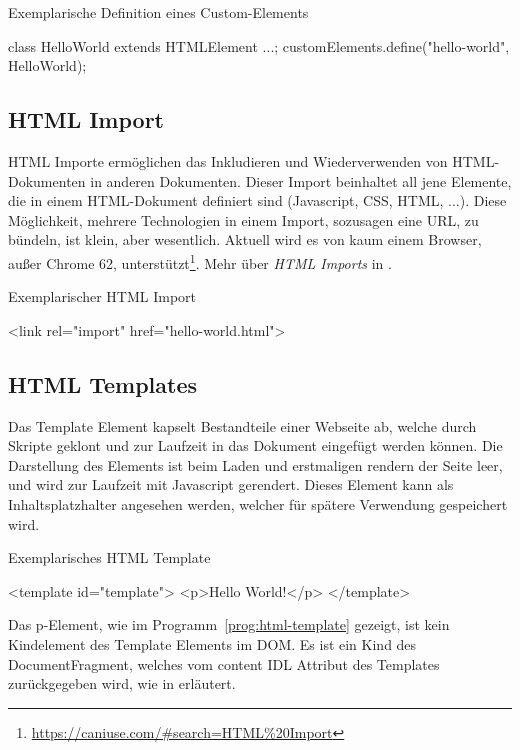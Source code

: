 \begin{program}[!htbp]
\caption{Exemplarische Definition eines Custom-Elements}
\begin{JsCode}
class HelloWorld extends HTMLElement {...};
customElements.define("hello-world", HelloWorld);
\end{JsCode}
\end{program}
\subsection{HTML Import}
HTML Importe ermöglichen das Inkludieren und Wiederverwenden von HTML-Dokumenten in anderen Dokumenten. Dieser Import beinhaltet all jene Elemente, die in einem HTML-Dokument definiert sind (Javascript, CSS, HTML, ...). 
Diese Möglichkeit, mehrere Technologien in einem Import, sozusagen eine URL, zu bündeln, ist klein, aber wesentlich. Aktuell wird es von kaum einem Browser, außer Chrome 62,  unterstützt\footnote{\url{https://caniuse.com/\#search=HTML\%20Import}}. Mehr über \emph{HTML Imports} in \cite{html-imports}.

\begin{program}[!htbp]
\caption{Exemplarischer HTML Import}
\begin{JsCode}
<link rel="import" href="hello-world.html">
\end{JsCode}
\end{program}
\subsection{HTML Templates}
Das Template Element kapselt Bestandteile einer Webseite ab, welche durch Skripte geklont und zur Laufzeit in das Dokument eingefügt werden können. Die Darstellung des Elements ist beim Laden und erstmaligen rendern der Seite leer, und wird zur Laufzeit mit Javascript gerendert. Dieses Element kann als Inhaltsplatzhalter angesehen werden, welcher für spätere Verwendung gespeichert wird. 

\begin{program}[!htbp]
\caption{Exemplarisches HTML Template}
\label{prog:html-template}
\begin{JsCode}
<template id="template">
	<p>Hello World!</p>
</template>
\end{JsCode}
\end{program}
Das p-Element, wie im Programm~\ref{prog:html-template} gezeigt, ist kein Kindelement des Template Elements im DOM. Es ist ein Kind des DocumentFragment, welches vom content IDL Attribut des Templates zurückgegeben wird, wie in \cite{html-templates} erläutert.

